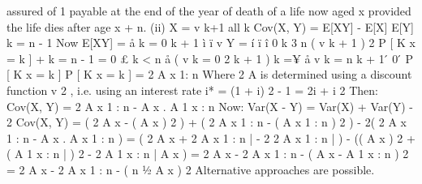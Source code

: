 assured of 1 payable at the end of the year of death of a life now aged x
provided the life dies after age x + n.
(ii) X = v k+1
all k
Cov(X, Y)
= E[XY] - E[X] E[Y]
k = n - 1
Now E[XY] =
å
k = 0
k + 1
ì
ï v
Y = í
ï
î 0
k 3 n
( v k + 1 ) 2 P [ K x = k ] +
k = n - 1
=
0 £ k < n
å ( v
k = 0
2 k + 1
)
k =¥
å v
k = n
k + 1
 ́ 0  ́ P [ K x = k ]
P [ K x = k ]
= 2 A x 1: n
Where 2 A is determined using a discount function v 2 , i.e. using an interest
rate
i* = (1 + i) 2 - 1 = 2i + i 2
Then: Cov(X, Y) = 2 A x 1 : n - A x . A 1 x : n
Now: Var(X - Y) = Var(X) + Var(Y) - 2 Cov(X, Y)
= ( 2 A x - ( A x ) 2 ) + ( 2 A x 1 : n - ( A x 1 : n ) 2 ) - 2( 2 A x 1 : n - A x . A x 1 : n )
= ( 2 A x + 2 A x 1 : n | - 2 2 A x 1 : n | ) - (( A x ) 2 + ( A 1 x : n | ) 2 - 2 A 1 x : n | A x )
= 2 A x - 2 A x 1 : n - ( A x - A 1 x : n ) 2
= 2 A x - 2 A x 1 : n - ( n 1⁄2 A x ) 2
Alternative approaches are possible.
